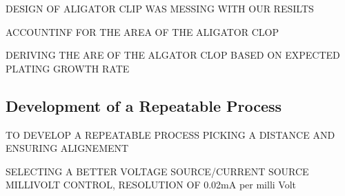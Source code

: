 DESIGN OF ALIGATOR CLIP WAS MESSING WITH OUR RESILTS

ACCOUNTINF FOR THE AREA OF THE ALIGATOR CLOP

DERIVING THE ARE OF THE ALGATOR CLOP BASED ON EXPECTED PLATING GROWTH RATE



\subsection{Development of a Repeatable Process}

TO DEVELOP A REPEATABLE PROCESS PICKING A DISTANCE AND ENSURING ALIGNEMENT

SELECTING A BETTER VOLTAGE SOURCE/CURRENT SOURCE MILLIVOLT CONTROL, RESOLUTION OF 0.02mA per milli Volt

